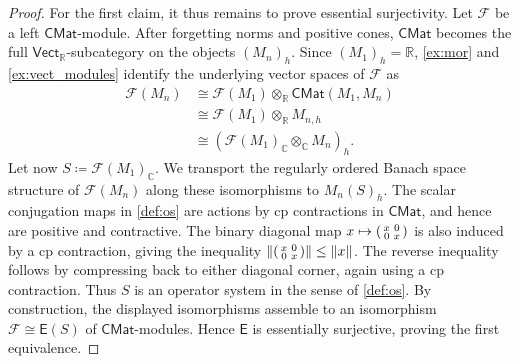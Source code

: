 \documentclass[11pt,onecolumn]{article}
\newcommand{\R}{\mathbb{R}}
\newcommand{\C}{\mathbb{C}}
\newcommand{\Vect}{\mathsf{Vect}}
\theoremstyle{plain}
\theoremstyle{remark}
\theoremstyle{definition}
\begin{document}
\begin{proof}
	For the first claim, it thus remains to prove essential surjectivity.
	Let $\mathcal{F}$ be a left $\mathsf{CMat}$-module.
	After forgetting norms and positive cones, $\mathsf{CMat}$ becomes the full $\Vect_\R$-subcategory on the objects $(M_n)_h$.
	Since $(M_1)_h = \R$, \cref{ex:mor} and \cref{ex:vect_modules} identify the underlying vector spaces of $\mathcal{F}$ as
	\begin{align*}
		\mathcal{F}(M_n) & \cong \mathcal{F}(M_1)\otimes_\R \mathsf{CMat}(M_1, M_n) \\
						 & \cong \mathcal{F}(M_1)\otimes_\R M_{n,h} \\
						 & \cong (\mathcal{F}(M_1)_{\C} \otimes_{\C} M_n)_h.
	\end{align*}
	Let now $S \coloneqq \mathcal{F}(M_1)_\C$.
	We transport the regularly ordered Banach space structure of $\mathcal{F}(M_n)$ along these isomorphisms to $M_n(S)_h$.
	The scalar conjugation maps in \cref{def:os} are actions by cp contractions in $\mathsf{CMat}$,
	and hence are positive and contractive.
	The binary diagonal map $x \mapsto \begin{psmallmatrix} x & 0 \\ 0 & x \end{psmallmatrix}$ is also induced by a cp contraction, giving the inequality $\|\begin{psmallmatrix} x & 0 \\ 0 & x \end{psmallmatrix}\| \le \|x\|$.
	The reverse inequality follows by compressing back to either diagonal corner, again using a cp contraction.
	Thus $S$ is an operator system in the sense of \cref{def:os}.
	By construction, the displayed isomorphisms assemble to an isomorphism $\mathcal{F} \cong \mathsf{E}(S)$ of $\mathsf{CMat}$-modules.
	Hence $\mathsf{E}$ is essentially surjective, proving the first equivalence.


\end{proof}
\end{document}
